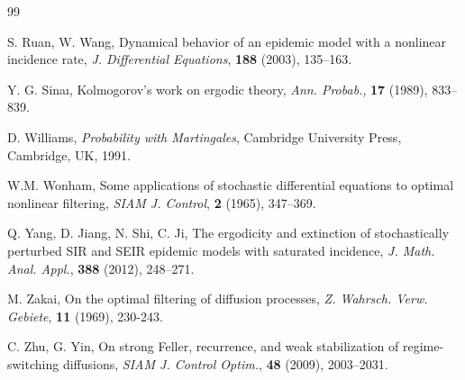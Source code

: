 \documentclass[12pt]{amsart}
\theoremstyle{remark}
\numberwithin{equation}{section}
\numberwithin{equation}{section}
\newcommand{\1}{\boldsymbol{1}}
\begin{document}
\begin{thebibliography}{99}
{
S. Ruan, W. Wang, Dynamical behavior of an epidemic model with a nonlinear incidence rate, {\it J. Differential Equations}, {\bf 188} (2003), 135--163.



 Y. G. Sinaı, Kolmogorov’s work on ergodic theory, {\it Ann. Probab.},
{\bf 17} (1989), 833--839.




 D. Williams, {\it Probability with Martingales}, Cambridge University Press, Cambridge, UK, 1991.

 W.M. Wonham,
Some applications of stochastic differential equations to
optimal nonlinear filtering, {\sl SIAM J. Control}, {\bf 2} (1965),
347--369.

Q. Yang, D. Jiang, N. Shi, C. Ji, The ergodicity and extinction of stochastically perturbed SIR and SEIR epidemic models with saturated incidence, {\it J. Math. Anal. Appl.}, {\bf 388} (2012),
248--271.

  M. Zakai, On the optimal filtering of diffusion processes,
  {\it Z. Wahrsch. Verw. Gebiete},
  {\bf 11} (1969), 230-243.


C. Zhu, G. Yin, On strong Feller, recurrence, and weak stabilization of regime-switching
diffusions, {\it SIAM J. Control Optim.}, {\bf 48} (2009),
2003--2031.

}
\end{thebibliography}
\end{document}

